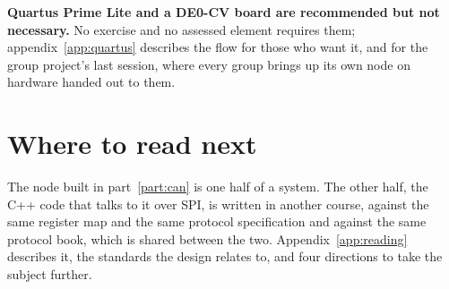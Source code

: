 \textbf{Quartus Prime Lite and a DE0-CV board are recommended but not necessary.} No exercise and
no assessed element requires them; appendix~\ref{app:quartus} describes the flow for those who
want it, and for the group project's last session, where every group brings up its own node on
hardware handed out to them.

\section*{Where to read next}
The node built in part~\ref{part:can} is one half of a system. The other half, the C++ code that
talks to it over SPI, is written in another course, against the same register map and the same
protocol specification \textemdash{} and against the same protocol book, which is shared between
the two. Appendix~\ref{app:reading} describes it, the standards the design relates to, and four
directions to take the subject further.
